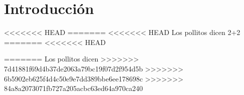 \section*{Introducción}

\lipsum[2]
<<<<<<< HEAD
=======
<<<<<<< HEAD
Los pollitos dicen
2+2
=======
<<<<<<< HEAD

\cite{medina1010}
=======
Los pollitos dicen
>>>>>>> 7d41881f69d4b37de2063a79bc19f07d2f954d5b
>>>>>>> 6b5902eb625f4d4c50e9e7dd389bbe6ee178698c
>>>>>>> 84a8a2073071fb727a205acbc63ed64a970ca240
